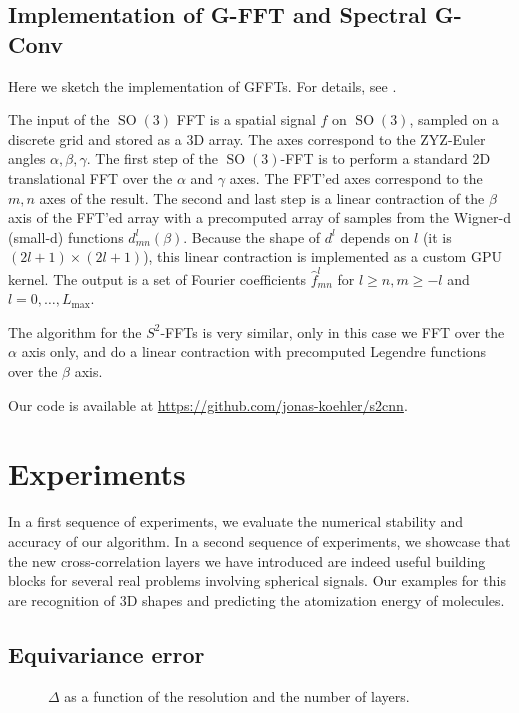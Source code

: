 \documentclass{article} %
\newcommand{\SO}[1]{\ensuremath{\operatorname{SO}(#1)}}
\begin{document}
\subsection{Implementation of G-FFT and Spectral G-Conv}
\label{sec:implementation}
Here we sketch the implementation of GFFTs.
For details, see \citep{Kostelec2007}.

The input of the $\SO3$ FFT is a spatial signal $f$ on $\SO3$, sampled on a discrete grid and stored as a 3D array.
The axes correspond to the ZYZ-Euler angles $\alpha, \beta, \gamma$.
The first step of the $\SO3$-FFT is to perform a standard 2D translational FFT over the $\alpha$ and $\gamma$ axes.
The FFT'ed axes correspond to the $m, n$ axes of the result.
The second and last step is a linear contraction of the $\beta$ axis of the FFT'ed array with a precomputed array of samples from the Wigner-d (small-d) functions $d^l_{mn}(\beta)$.
Because the shape of $d^l$ depends on $l$ (it is $(2l+1)\times(2l+1)$),
this linear contraction is implemented as a custom GPU kernel.
The output is a set of Fourier coefficients $\hat{f}^l_{mn}$ for $l \geq n, m  \geq -l$ and $l =0, \ldots, L_{\max}$.

The algorithm for the $S^2$-FFTs is very similar, only in this case we FFT over the $\alpha$ axis only, and do a linear contraction with precomputed Legendre functions over the $\beta$ axis.

Our code is available at \url{https://github.com/jonas-koehler/s2cnn}.


\section{Experiments}

In a first sequence of experiments, we evaluate the numerical stability and accuracy of our algorithm.
In a second sequence of experiments, we showcase that the new cross-correlation layers we have introduced are indeed useful building blocks for several real problems involving spherical signals.
Our examples for this are recognition of 3D shapes and predicting the atomization energy of molecules.


\subsection{Equivariance error}

\begin{figure}
    \centering
    
    \caption{\label{fig:equivariance}$\Delta$ as a function of the resolution and the number of layers.}
\end{figure}
\end{document}

